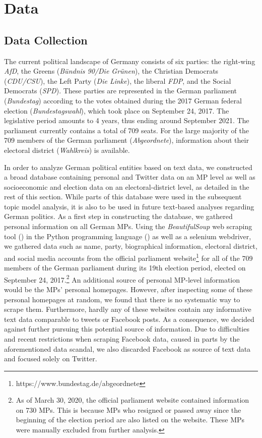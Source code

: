 \section{Data}
\label{Data}

\subsection{Data Collection}
\label{Data Collection}

The current political landscape of Germany consists of six parties: the right-wing \textit{AfD}, the Greens (\textit{Bündnis 90/Die Grünen}), the Christian Democrats (\textit{CDU/CSU}), the Left Party (\textit{Die Linke}), the liberal \textit{FDP}, and the Social Democrats (\textit{SPD}). These parties are represented in the German parliament (\textit{Bundestag}) according to the votes obtained during the 2017 German federal election (\textit{Bundestagswahl}), which took place on September 24, 2017. The legislative period amounts to 4 years, thus ending around September 2021. The parliament currently contains a total of 709 seats. For the large majority of the 709 members of the German parliament (\textit{Abgeordnete}), information about their electoral district (\textit{Wahlkreis}) is available.

In order to analyze German political entities based on text data, we constructed a broad database containing personal and Twitter data on an MP level as well as socioeconomic and election data on an electoral-district level, as detailed in the rest of this section. While parts of this database were used in the subsequent topic model analysis, it is also to be used in future text-based analyses regarding German politics. As a first step in constructing the database, we gathered personal information on all German MPs. Using the \textit{BeautifulSoup} web scraping tool (\citealp{richardson2007beautiful}) in the Python programming language (\citealp{van1995python}) as well as a selenium webdriver, we gathered data such as name, party, biographical information, electoral district, and social media accounts from the official parliament website\footnote{https://www.bundestag.de/abgeordnete} for all of the 709 members of the German parliament during its 19th election period, elected on September 24, 2017.\footnote{As of March 30, 2020, the official parliament website contained information on 730 MPs. This is because MPs who resigned or passed away since the beginning of the election period are also listed on the website. These MPs were manually excluded from further analysis.} An additional source of personal MP-level information would be the MPs' personal homepages. However, after inspecting some of these personal homepages at random, we found that there is no systematic way to scrape them. Furthermore, hardly any of these websites contain any informative text data comparable to tweets or Facebook posts. As a consequence, we decided against further pursuing this potential source of information. Due to difficulties and recent restrictions when scraping Facebook data, caused in parts by the aforementioned data scandal, we also discarded Facebook as source of text data and focused solely on Twitter. 


